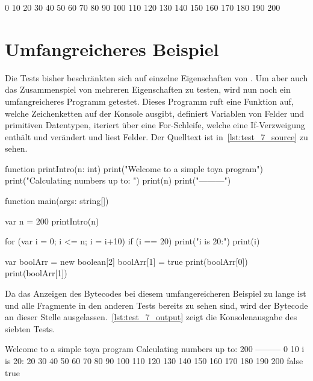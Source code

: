 \begin{ToyaCode}[numbers=none, caption={Konsolen-Ausgabe der For-Schleife},label=lst:test_6_output]
0
10
20
30
40
50
60
70
80
90
100
110
120
130
140
150
160
170
180
190
200
\end{ToyaCode}

\section{Umfangreicheres Beispiel}
Die Tests bisher beschränkten sich auf einzelne Eigenschaften von \toya. Um aber auch das Zusammenspiel von mehreren Eigenschaften zu testen, wird nun noch ein umfangreicheres Programm getestet. Dieses Programm ruft eine Funktion auf, welche Zeichenketten auf der Konsole ausgibt, definiert Variablen von Felder und primitiven Datentypen, iteriert über eine For-Schleife, welche eine If-Verzweigung enthält und verändert und liest Felder. Der Quelltext ist in~\autoref{lst:test_7_source} zu sehen.

\begin{ToyaCode}[numbers=none, caption={Quelltext des umfangereicheren Beispiels},label=lst:test_7_source]
function printIntro(n: int) {
    print("Welcome to a simple toya program")
    print("Calculating numbers up to: ")
    print(n)
    print("---------")
}

function main(args: string[]) {
    var n = 200
    printIntro(n)

    for (var i = 0; i <= n; i = i+10) {
        if (i == 20) {
            print("i is 20:")
        }
        print(i)
    }

    var boolArr = new boolean[2]
    boolArr[1] = true
    print(boolArr[0])
    print(boolArr[1])
}
\end{ToyaCode}

Da das Anzeigen des Bytecodes bei diesem umfangereicheren Beispiel zu lange ist und alle Fragmente in den anderen Tests bereits zu sehen sind, wird der Bytecode an dieser Stelle ausgelassen.~\autoref{lst:test_7_output} zeigt die Konsolenausgabe des siebten Tests.

\begin{ToyaCode}[numbers=none, caption={Konsolen-Ausgabe des umfangereicheren Beispiels},label=lst:test_7_output]
Welcome to a simple toya program
Calculating numbers up to:
200
---------
0
10
i is 20:
20
30
40
50
60
70
80
90
100
110
120
130
140
150
160
170
180
190
200
false
true    
\end{ToyaCode}